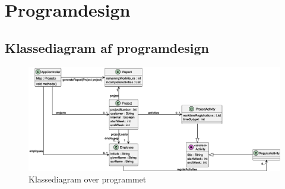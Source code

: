 \section{Programdesign}
\subsection{Klassediagram af programdesign}
\begin{figure}[H]
    \centering
    \caption{Klassediagram over programmet}\label{fig:ClassDiag}
    \includegraphics[width = \textwidth]{Diagrams/ClassDiagram.eps}
\end{figure}
